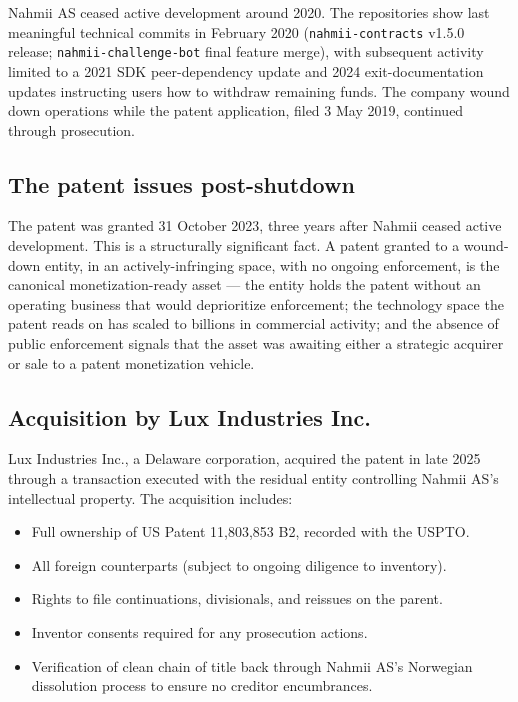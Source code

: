 \documentclass[11pt,letterpaper]{article}
\begin{document}
Nahmii AS ceased active development around 2020. The repositories show last meaningful technical commits in February 2020 (\texttt{nahmii-contracts} v1.5.0 release; \texttt{nahmii-challenge-bot} final feature merge), with subsequent activity limited to a 2021 SDK peer-dependency update and 2024 exit-documentation updates instructing users how to withdraw remaining funds. The company wound down operations while the patent application, filed 3 May 2019, continued through prosecution.

\subsection{The patent issues post-shutdown}

The patent was granted 31 October 2023, three years after Nahmii ceased active development. This is a structurally significant fact. A patent granted to a wound-down entity, in an actively-infringing space, with no ongoing enforcement, is the canonical monetization-ready asset --- the entity holds the patent without an operating business that would deprioritize enforcement; the technology space the patent reads on has scaled to billions in commercial activity; and the absence of public enforcement signals that the asset was awaiting either a strategic acquirer or sale to a patent monetization vehicle.

\subsection{Acquisition by Lux Industries Inc.}

Lux Industries Inc., a Delaware corporation, acquired the patent in late 2025 through a transaction executed with the residual entity controlling Nahmii AS's intellectual property. The acquisition includes:

\begin{itemize}
\item Full ownership of US Patent 11,803,853 B2, recorded with the USPTO.
\item All foreign counterparts (subject to ongoing diligence to inventory).
\item Rights to file continuations, divisionals, and reissues on the parent.
\item Inventor consents required for any prosecution actions.
\item Verification of clean chain of title back through Nahmii AS's Norwegian dissolution process to ensure no creditor encumbrances.
\end{itemize}
\end{document}
